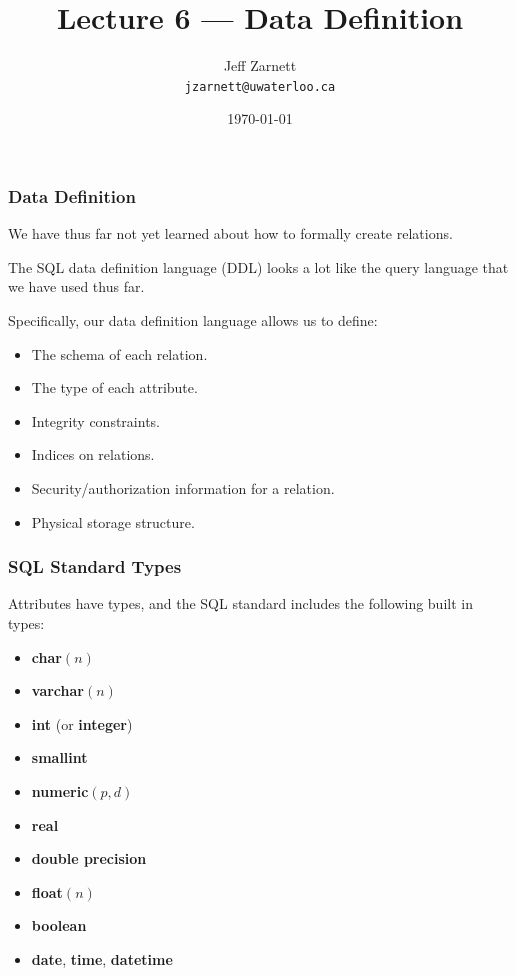 

\title{Lecture 6 --- Data Definition  }

\author{Jeff Zarnett \\ \small \texttt{jzarnett@uwaterloo.ca}}
\date{\today}




\begin{frame}
  \titlepage

 \end{frame}
 
 
\begin{frame}
\frametitle{Data Definition}

We have thus far not yet learned about how to formally create relations.

The SQL data definition language (DDL) looks a lot like the query language that we have used thus far.

Specifically, our data definition language allows us to define:
\begin{itemize}
	\item The schema of each relation.
	\item The type of each attribute.
	\item Integrity constraints.
	\item Indices on relations.
	\item Security/authorization information for a relation.
	\item Physical storage structure.
\end{itemize}

\end{frame}


\begin{frame}
\frametitle{SQL Standard Types}

Attributes have types, and the SQL standard includes the following built in types:

\begin{itemize}
\item \textbf{char}$(n)$
\item \textbf{varchar}$(n)$
\item \textbf{int} (or \textbf{integer})
\item \textbf{smallint}
\item \textbf{numeric}$(p, d)$
\item \textbf{real}
\item \textbf{double precision}
\item \textbf{float}$(n)$
\item \textbf{boolean}
\item \textbf{date}, \textbf{time}, \textbf{datetime}
\end{itemize}

\end{frame}

